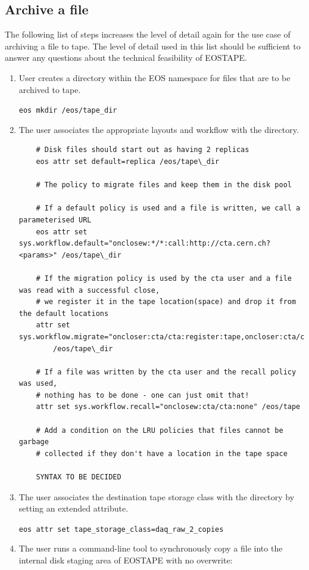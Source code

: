 \documentclass{article}
\begin{document}
\subsection{Archive a file}
The following list of steps increases the level of detail again for the use case of archiving a file to tape.  The level of detail used in this list should be sufficient to answer any questions about the technical feasibility of EOSTAPE. 
\begin{enumerate}
\item User creates a directory within the EOS namespace for files that are to be archived to tape.

\texttt{eos mkdir /eos/tape\_dir}

\item The user associates the appropriate layouts and workflow with the directory.

\begin{verbatim}
	# Disk files should start out as having 2 replicas
	eos attr set default=replica /eos/tape\_dir

	# The policy to migrate files and keep them in the disk pool

	# If a default policy is used and a file is written, we call a parameterised URL
	eos attr set sys.workflow.default="onclosew:*/*:call:http://cta.cern.ch?<params>" /eos/tape\_dir

	# If the migration policy is used by the cta user and a file was read with a successful close,
	# we register it in the tape location(space) and drop it from the default locations
	attr set sys.workflow.migrate="oncloser:cta/cta:register:tape,oncloser:cta/cta:drop:default"
	    /eos/tape\_dir

	# If a file was written by the cta user and the recall policy was used,
	# nothing has to be done - one can just omit that!
	attr set sys.workflow.recall="onclosew:cta/cta:none" /eos/tape

	# Add a condition on the LRU policies that files cannot be garbage
	# collected if they don't have a location in the tape space

	SYNTAX TO BE DECIDED
\end{verbatim}
\item The user associates the destination tape storage class with the directory by setting an extended attribute.

\texttt{eos attr set tape\_storage\_class=daq\_raw\_2\_copies}

\item The user runs a command-line tool to synchronously copy a file into the internal disk staging area of EOSTAPE with no overwrite:


\end{enumerate}
\end{document}
